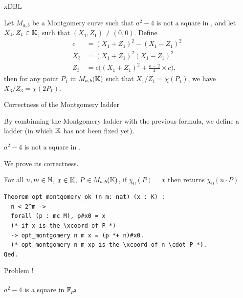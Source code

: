 \documentclass[8pt,aspectratio=169]{beamer}
\begin{document}
%
%
\begin{frame}{xDBL}
	\begin{lemma}
		Let $M_{a,b}$ be a Montgomery curve such that $a^2-4$ is not a square in \K, and
		let $X_1, Z_1 \in \mathbb{K}$, such that $(X_1,Z_1) \neq (0,0)$. Define
		\begin{align*}
			c   & = (X_1 + Z_1)^2 - (X_1 - Z_1)^2                   \\
			X_3 & = (X_1 + Z_1)^2(X_1-Z_1)^2                        \\
			Z_3 & = c\Big((X_1 + Z_1)^2+\frac{a-2}{4}\times c\Big),
		\end{align*}
		then for any point $P_1$ in $M_{a,b}(\mathbb{K})$ such that $X_1/Z_1 = \chi(P_1)$,
		we have $X_3/Z_3 = \chi(2P_1)$.
	\end{lemma}
\end{frame}


%
%
\begin{frame}[fragile]{Correctness of the Montgomery ladder}

	By combinning the Montgomery ladder with the previous formula, we define a ladder  (in which $\mathbb{K}$ has not been fixed yet).

	\begin{hypothesis}
		$a^2-4$ is not a square in \K.
	\end{hypothesis}

	We prove its correctness.
	\begin{theorem}
		\label{thm:montgomery-ladder-correct}
		For all $n, m \in \mathbb{N}$, $x \in \mathbb{K}$, $P \in M_{a,b}(\mathbb{K})$,
		if $\chi_0(P) = x$ then  returns $\chi_0(n \cdot P)$
	\end{theorem}
	\begin{lstlisting}[language=Coq, basicstyle=\normalsize]
Theorem opt_montgomery_ok (n m: nat) (x : K) :
  n < 2^m ->
  forall (p : mc M), p#x0 = x
  (* if x is the \xcoord of P *)
  -> opt_montgomery n m x = (p *+ n)#x0.
  (* opt_montgomery n m xp is the \xcoord of n \cdot P *).
Qed.
  \end{lstlisting}

\end{frame}


%
%
\begin{frame}[standout]
	\begin{center}
		{  \huge
			Problem !\\~\\
			$a^2-4$ is a square in $\mathbb{F}_{p^2}$}
	\end{center}
\end{frame}
\end{document}
